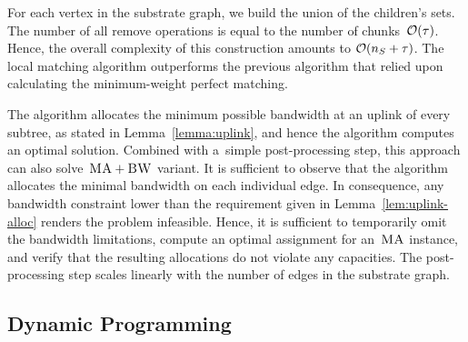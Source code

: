  For each
vertex in the substrate graph,
we build the union of the
children's sets.
The number of all remove operations is equal to
the number of chunks~$\mathcal{O}(\tau)$.
Hence, the overall complexity of this construction amounts to
$\mathcal{O}(n_S + \tau)$.
The local matching algorithm outperforms the previous algorithm that relied upon calculating the minimum-weight perfect matching.


%

The algorithm allocates the minimum possible bandwidth at an uplink of every subtree, as stated in Lemma~\ref{lemma:uplink}, and hence the algorithm computes an optimal solution.
Combined with a~simple post-processing step, this approach can also solve~$\textsc{MA}+\textsc{BW}$ variant.
It is sufficient to observe
that the algorithm allocates the minimal bandwidth
on each individual edge. In consequence, any bandwidth constraint
lower than the requirement given in Lemma~\ref{lem:uplink-alloc} renders
the problem infeasible. Hence, it is sufficient to temporarily omit the
bandwidth limitations, compute an optimal assignment for an~$\textsc{MA}$ instance, and
verify that the resulting allocations do not violate any capacities. The
post-processing step scales linearly with the number of edges in the substrate
graph.


\subsection{Dynamic Programming}\label{ssec:dyn}

